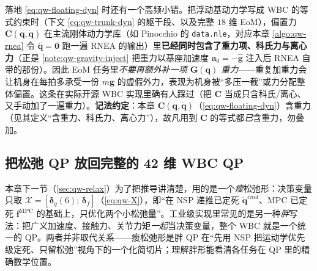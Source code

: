 \begin{pitfall}[机身动力学方程里的偏置力别重复加重力]\label{pit:qw-nle-gravity}
落地 \cref{eq:qw-floating-dyn} 时还有一个高频小错。把浮动基动力学写成 WBC 的等式约束时（下文 \cref{eq:qw-trunk-dyn} 的躯干段、以及完整 $18$ 维 EoM），偏置力 $\boldsymbol{C}(\boldsymbol{q},\dot{\boldsymbol{q}})$ 在主流刚体动力学库（如 Pinocchio 的 \texttt{data.nle}，对应本章 \cref{algo:qw-rnea} 令 $\ddot{\boldsymbol{q}}=\mathbf{0}$ 跑一遍 RNEA 的输出）里\textbf{已经同时包含了重力项、科氏力与离心力}（正是 \cref{note:qw-gravity-inject} 把重力以基座加速度 $\boldsymbol{a}_0=-\hat{\boldsymbol{g}}$ 注入后 RNEA 自带的那份）。因此 EoM 任务里\emph{不要再额外补一项 $\boldsymbol{G}(\boldsymbol{q})$ 重力}——重复加重力会让机身在每拍多承受一份 $m\boldsymbol{g}$ 的虚假外力，表现为机身被“多压一截”或力分配整体偏置。这条在实际开源 WBC 实现里确有人踩过（把 $\boldsymbol{C}$ 当成只含科氏/离心、又手动加了一遍重力）。\textbf{记法约定}：本章 $\boldsymbol{C}(\boldsymbol{q},\dot{\boldsymbol{q}})$（\cref{eq:qw-floating-dyn}）含重力（见其定义“含重力、科氏力、离心力”），故凡用到 $\boldsymbol{C}$ 的等式都\emph{已}含重力，勿叠加。
\end{pitfall}

\subsection{把松弛 QP 放回完整的 42 维 WBC QP}
\label{subsec:qw-42dof}

本章下一节（\cref{sec:qw-relax}）为了把推导讲清楚，用的是一个\emph{瘦}松弛形：决策变量只取 $\boldsymbol{\mathcal{X}}=[\boldsymbol{\delta}_{\ddot{q}}(6);\,\boldsymbol{\delta}_f]$（\cref{eq:qw-X}），即“在 NSP 递推已定死 $\ddot{\boldsymbol{q}}^{cmd}$、MPC 已定死 $\boldsymbol{f}^{\mathrm{MPC}}$ 的基础上，只优化两个小松弛量”。工业级实现里常见的是另一种\emph{胖}写法：把广义加速度、接触力、关节力矩\emph{一起}当决策变量，整个 WBC 就是一个统一的 QP。两者并非取代关系——瘦松弛形是胖 QP 在“先用 NSP 把运动学优先级定死、只留松弛”视角下的一个化简切片；理解胖形能看清各任务在 QP 里的精确数学位置。

